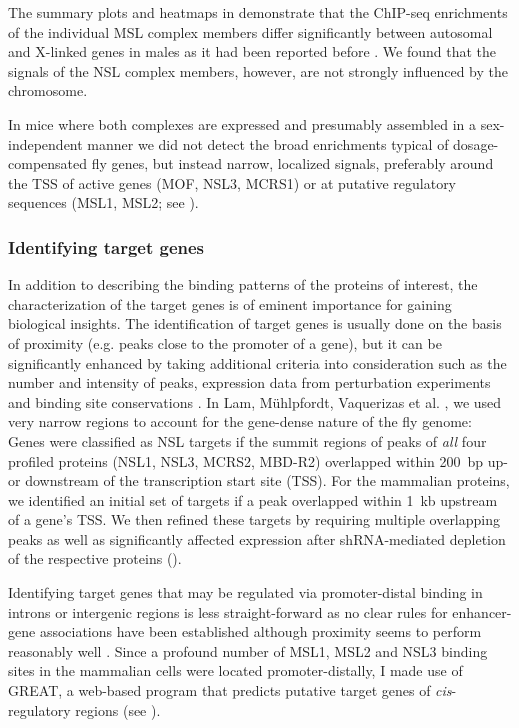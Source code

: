 The summary plots and heatmaps in  demonstrate that the ChIP-seq enrichments of the individual MSL complex members differ significantly between autosomal and X-linked genes in males as it had been reported before \citep{Alekseyenko2006, Kind2008, Straub2013}. We found that the signals of the NSL complex members, however, are not strongly influenced by the chromosome.

In mice where both complexes are expressed and presumably assembled in a sex-in\-de\-pen\-dent manner we did not detect the broad enrichments typical of dosage-compensated fly genes, but instead narrow, localized signals, preferably around the TSS of active genes (MOF, NSL3, MCRS1) or at putative regulatory sequences (MSL1, MSL2; see ). 
\clearpage
%
\subsubsection{Identifying target genes}
In addition to describing the binding patterns of the proteins of interest, the characterization of the target genes is of eminent importance for gaining biological insights. The identification of target genes is usually done on the basis of proximity (e.g. peaks close to the promoter of a gene), but it can be significantly enhanced by taking additional criteria into consideration such as the number and intensity of peaks, expression data from perturbation experiments and binding site conservations \citep{Sikora2013}. In Lam, Mühlpfordt, Vaquerizas et al. \cite{Lam2012}, we used very narrow regions to account for the gene-dense nature of the fly genome: Genes were classified as NSL targets if the summit regions of peaks of \textit{all} four profiled proteins (NSL1, NSL3, MCRS2, MBD-R2) overlapped within 200~bp up- or downstream of the transcription start site (TSS). For the mammalian proteins, we identified an initial set of targets if a peak overlapped within 1~kb upstream of a gene’s TSS. We then refined these targets by requiring multiple overlapping peaks as well as significantly affected expression after shRNA-mediated depletion of the respective proteins ().

Identifying target genes that may be regulated via promoter-distal binding in introns or intergenic regions is less straight-forward as no clear rules for enhancer-gene associations have been established although proximity seems to perform reasonably well \citep{Shen2012}. Since a profound number of MSL1, MSL2 and NSL3 binding sites in the mammalian cells were located promoter-distally, I made use of GREAT, a web-based program that predicts putative target genes of \textit{cis}-regulatory regions \citep{McLean2010} (see ).
%
